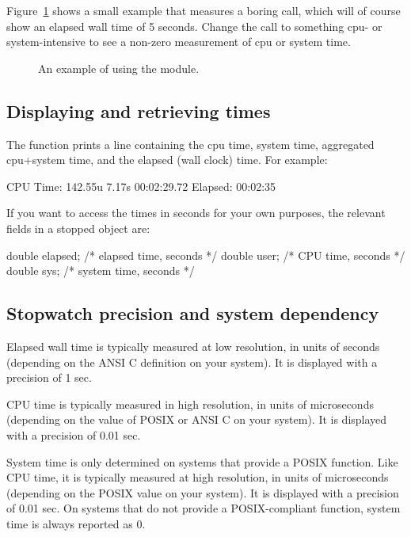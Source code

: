 Figure~\ref{fig:stopwatch_example} shows a small example that measures
a boring  call, which will of course show an elapsed
wall time of 5 seconds.  Change the  call to something
cpu- or system-intensive to see a non-zero measurement of cpu or
system time.

\begin{figure}

\caption{An example of using the  module.}
\label{fig:stopwatch_example}
\end{figure}

\subsection{Displaying and retrieving times}

The  function prints a line
containing the cpu time, system time, aggregated cpu+system time, and
the elapsed (wall clock) time. For example:

\begin{cchunk}
CPU Time: 142.55u 7.17s 00:02:29.72 Elapsed: 00:02:35
\end{cchunk}

If you want to access the times in seconds for your own purposes, the
relevant fields in a stopped  object are:

\begin{cchunk}
  double elapsed;               /* elapsed time, seconds */
  double user;                  /* CPU time, seconds     */
  double sys;                   /* system time, seconds  */
\end{cchunk}



\subsection{Stopwatch precision and system dependency}

Elapsed wall time is typically measured at low resolution, in units of
seconds (depending on the ANSI C  definition on your
system). It is displayed with a precision of 1 sec.

CPU time is typically measured in high resolution, in units of
microseconds (depending on the value of POSIX  or
ANSI C  on your system). It is displayed with a
precision of 0.01 sec.

System time is only determined on systems that provide a POSIX
 function. Like CPU time, it is typically measured at
high resolution, in units of microseconds (depending on the POSIX
 value on your system). It is displayed with a
precision of 0.01 sec.  On systems that do not provide a
POSIX-compliant  function, system time is always
reported as 0.

